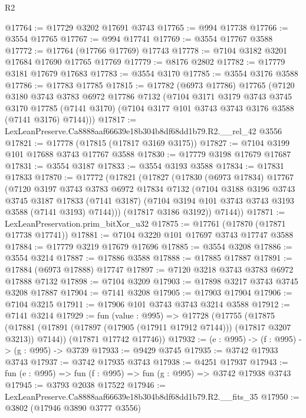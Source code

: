 \begin{lexlean}{R2}
\begin{coremodule}
@17764 := @17729 @3202 @17691 @3743
@17765 := @994 @17738
@17766 := @3554 @17765
@17767 := @994 @17741
@17769 := @3554 @17767 @3588
@17772 := @17764 (@17766 @17769) @17743
@17778 := @7104 @3182 @3201 @17684 @17690 @17765 @17769
@17779 := @8176 @2802
@17782 := @17779 @3181 @17679 @17683
@17783 := @3554 @3170
@17785 := @3554 @3176 @3588
@17786 := @17783 @17785
@17815 := @17782
    (@6973 @17786)
    @17765
    (@7120
      @3180
      @3743
      @3783
      @6972
      @17786
      @7132
      (@7104
        @3171
        @3179
        @3743
        @3745
        @3170
        @17785
        (@7141 @3170)
        (@7104 @3177 @101 @3743 @3743 @3176 @3588 (@7141 @3176) @7144)))
@17817 := LexLeanPreserve.Ca8888aaf66639e18b304b8df68dd1b79.R2.__rel_42 @3556
@17821 := @17778 (@17815 (@17817 @3169 @3175))
@17827 := @7104 @3199 @101 @17688 @3743 @17767 @3588
@17830 := @17779 @3198 @17679 @17687
@17831 := @3554 @3187
@17833 := @3554 @3193 @3588
@17834 := @17831 @17833
@17870 := @17772
    (@17821
      (@17827
        (@17830
          (@6973 @17834)
          @17767
          (@7120
            @3197
            @3743
            @3783
            @6972
            @17834
            @7132
            (@7104
              @3188
              @3196
              @3743
              @3745
              @3187
              @17833
              (@7141 @3187)
              (@7104 @3194 @101 @3743 @3743 @3193 @3588 (@7141 @3193) @7144)))
          (@17817 @3186 @3192))
        @7144))
@17871 := LexLeanPreservation.prim_bitXor_u32
@17875 := @17761 (@17870 (@17871 @17738 @17741))
@17881 := @7104 @3220 @101 @17697 @3743 @17747 @3588
@17884 := @17779 @3219 @17679 @17696
@17885 := @3554 @3208
@17886 := @3554 @3214
@17887 := @17886 @3588
@17888 := @17885 @17887
@17891 := @17884 (@6973 @17888) @17747
@17897 := @7120 @3218 @3743 @3783 @6972 @17888 @7132
@17898 := @7104 @3209
@17903 := @17898 @3217 @3743 @3745 @3208 @17887
@17904 := @7141 @3208
@17905 := @17903 @17904
@17906 := @7104 @3215
@17911 := @17906 @101 @3743 @3743 @3214 @3588
@17912 := @7141 @3214
@17929 := fun (value : @995) =>
  @17728
    (@17755
      (@17875 (@17881 (@17891 (@17897 (@17905 (@17911 @17912 @7144))) (@17817 @3207 @3213)) @7144))
      (@17871 @17742 @17746))
@17932 := (e : @995) -> (f : @995) -> (g : @995) -> @3739
@17933 := @9429 @3745
@17935 := @3742 @17933 @3743
@17937 := @3742 @17935 @3743
@17938 := @4251 @17937
@17943 := fun (e : @995) => fun (f : @995) => fun (g : @995) => @3742 @17938 @3743
@17945 := @3793 @2038 @17522
@17946 := LexLeanPreserve.Ca8888aaf66639e18b304b8df68dd1b79.R2.__fits_35
@17950 := @3802 (@17946 @3890 @3777 @3556)

\end{coremodule}
\end{lexlean}
